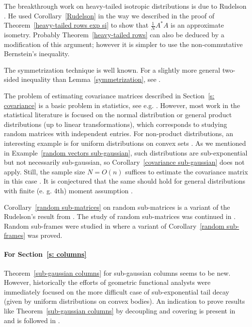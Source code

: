 \documentclass[10pt, openany]{book}
\theoremstyle{remark}
\begin{document}
The breakthrough work on heavy-tailed isotropic distributions is due to Rudelson \cite{Rudelson isotropic}.
He used Corollary~\ref{Rudelson} in the way we described in the proof of 
Theorem~\ref{heavy-tailed rows exp si} to show that $\frac{1}{N} A^*A$ is an approximate isometry.
Probably Theorem~\ref{heavy-tailed rows} can also be deduced by a modification of this argument; 
however it is simpler to use the non-commutative Bernstein's inequality.

The symmetrization technique is well known. 
For a slightly more general two-sided inequality than Lemma~\ref{symmetrization},
see \cite[Lemma~6.3]{Ledoux-Talagrand}.

The problem of estimating covariance matrices described in Section~\ref{s: covariance} is 
a basic problem in statistics, see e.g. \cite{Johnstone}.
However, most work in the statistical literature is focused on the normal distribution 
or general product distributions (up to linear transformations), 
which corresponds to studying random matrices with independent entries. 
For non-product distributions, an interesting example
is for uniform distributions on convex sets \cite{KLS}. 
As we mentioned in Example~\ref{random vectors sub-gaussian}, such 
distributions are sub-exponential but not necessarily sub-gaussian, 
so Corollary~\ref{covariance sub-gaussian} does not apply. 
Still, the sample size $N = O(n)$ suffices to estimate the covariance matrix in this case 
\cite{ALPT}. It is conjectured that the same should hold for general distributions with 
finite (e. g. $4$th) moment assumption  \cite{V covariance}.

Corollary~\ref{random sub-matrices} on random sub-matrices is a variant of 
the Rudelson's result from \cite{Rudelson sub-matrices}. The study of random sub-matrices
was continued in \cite{RV sampling}. Random sub-frames were studied in \cite{V frames}
where a variant of Corollary~\ref{random sub-frames} was proved. 


\paragraph{For Section~\ref{s: columns}}

Theorem~\ref{sub-gaussian columns} for sub-gaussian columns seems to be new. 
However, historically the efforts of geometric functional analysts were immediately focused on the more difficult case 
of sub-exponential tail decay (given by uniform distributions on convex bodies).
An indication to prove results like Theorem~\ref{sub-gaussian columns} 
by decoupling and covering is present in \cite{Bourgain}
and is followed in \cite{GiMi concentration, ALPT}.
\end{document}
